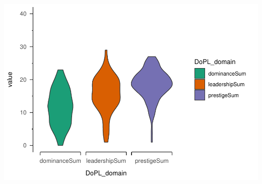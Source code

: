 \documentclass[
  english,
  man]{apa6}
\begin{document}
\includegraphics{DoPL-Experiment_files/figure-latex/unnamed-chunk-2-1.pdf}
\end{document}
